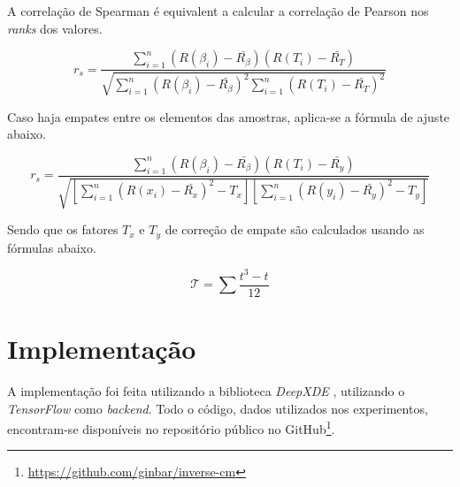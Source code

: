 A correlação de Spearman é equivalent a calcular a correlação de Pearson nos 
\textit{ranks} dos valores.

\begin{equation}
r_s = \frac{\sum_{i=1}^{n} (R(\beta_i) - \bar{R_{\beta}})(R(T_i) - \bar{R_{T}})}{\sqrt{\sum_{i=1}^{n} (R(\beta_i) - \bar{R_{\beta}})^2 \sum_{i=1}^{n} (R(T_i) - \bar{R_T})^2}}
\end{equation}

Caso haja empates entre os elementos das amostras, aplica-se a fórmula de ajuste
abaixo.

\begin{equation}
r_s = \frac{\sum_{i=1}^{n} (R(\beta_i) - \bar{R_{\beta}})(R(T_i) - \bar{R_y})}{\sqrt{\left[\sum_{i=1}^{n} (R(x_i) - \bar{R_x})^2 - T_x\right]\left[\sum_{i=1}^{n} (R(y_i) - \bar{R_y})^2 - T_y\right]}}
\end{equation}

Sendo que os fatores $T_x$ e $T_y$ de correção de empate são calculados
usando as fórmulas abaixo.  

\begin{equation}
\mathcal{T} = \sum \frac{t^3 - t}{12}
\end{equation}


\section{Implementação}

A implementação foi feita utilizando a biblioteca \textit{DeepXDE} \cite{lu-etal:21-deepxde}, 
utilizando o \textit{TensorFlow} \cite{tensorflow:16} como \textit{backend}. 
Todo o código, dados utilizados nos experimentos,
encontram-se disponíveis no repositório público no 
GitHub\footnote{\url{https://github.com/ginbar/inverse-cm}}.
